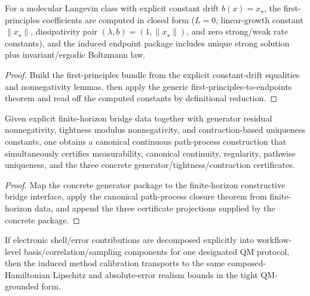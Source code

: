 \begin{theorem}\label{thm:explicit-molecular-constant-drift-sde-endpoints}
For a molecular Langevin class with explicit constant drift $b(x)=x_\star$, the first-principles coefficients are computed in closed form ($L=0$, linear-growth constant $\|x_\star\|$, dissipativity pair $(\lambda,b)=(1,\|x_\star\|)$, and zero strong/weak rate constants), and the induced endpoint package includes unique strong solution plus invariant/ergodic Boltzmann law.
\end{theorem}

\begin{proof}
Build the first-principles bundle from the explicit constant-drift equalities and nonnegativity lemmas, then apply the generic first-principles-to-endpoints theorem and read off the computed constants by definitional reduction.
\end{proof}

\begin{theorem}\label{thm:concrete-generator-canonical-path-process-closure}
Given explicit finite-horizon bridge data together with generator residual nonnegativity, tightness modulus nonnegativity, and contraction-based uniqueness constants, one obtains a canonical continuous path-process construction that simultaneously certifies measurability, canonical continuity, regularity, pathwise uniqueness, and the three concrete generator/tightness/contraction certificates.
\end{theorem}

\begin{proof}
Map the concrete generator package to the finite-horizon constructive bridge interface, apply the canonical path-process closure theorem from finite-horizon data, and append the three certificate projections supplied by the concrete package.
\end{proof}

\begin{theorem}\label{thm:qm-workflow-specific-realism-transport-bundle}
If electronic shell/error contributions are decomposed explicitly into workflow-level basis/correlation/sampling components for one designated QM protocol, then the induced method calibration transports to the same composed-Hamiltonian Lipschitz and absolute-error realism bounds in the tight QM-grounded form.
\end{theorem}

